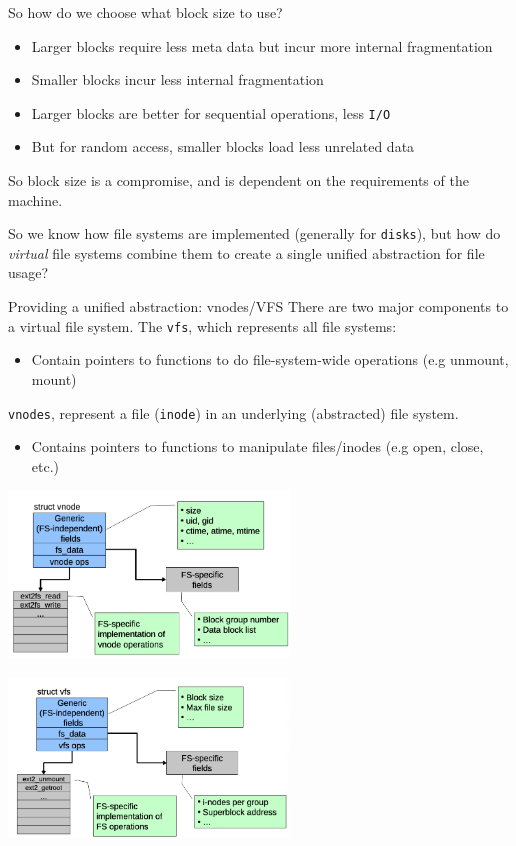 \documentclass[journal, letterpaper]{IEEEtran}
\begin{document}
\begin{aside}{So how do we choose what block size to use?}
    \begin{itemize}
        \item Larger blocks require less meta data but incur more internal fragmentation
        \item Smaller blocks incur less internal fragmentation
        \item Larger blocks are better for sequential operations, less \verb|I/O|
        \item But for random access, smaller blocks load less unrelated data
    \end{itemize}
    So block size is a compromise, and is dependent on the requirements of the machine.
\end{aside}
So we know how file systems are implemented (generally for \verb|disks|), but how do \textit{virtual} file systems combine them to create a single unified abstraction for file usage?
\begin{theory}{Providing a unified abstraction: vnodes/VFS} 
    There are two major components to a virtual file system. The \verb|vfs|, which represents all file systems:
    \begin{itemize}
        \item Contain pointers to functions to do file-system-wide operations (e.g unmount, mount)
    \end{itemize}
    \verb|vnodes|, represent a file (\verb|inode|) in an underlying (abstracted) file system.
    \begin{itemize}
        \item Contains pointers to functions to manipulate files/inodes (e.g open, close, etc.)
    \end{itemize}
    \begin{center}
        \includegraphics[width=7.5cm]{./photos/vnode.png}
    \end{center}
    \begin{center}
        \includegraphics[width=7.5cm]{./photos/vfs.png}
    \end{center}
\end{theory}
\end{document}
